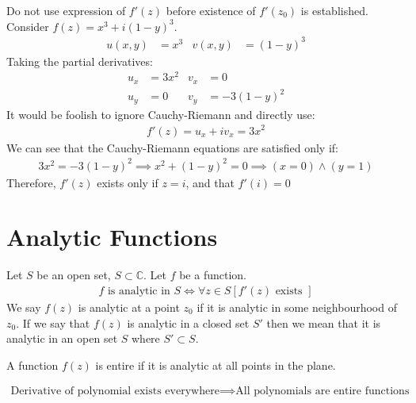 \documentclass[12pt, english]{book}
\begin{document}
	\begin{example}
		Do not use expression of \(f'(z)\) before existence of \(f'(z_0)\)  is established.
		Consider \(f(z) = x^3 + i(1-y)^3\).
		\begin{align*}
			u(x,y) &= x^3	& 	v(x,y) &= (1-y)^3
		\end{align*}
		Taking the partial derivatives:
		\begin{align*}
			u_x &= 3x^2	& 	v_x &= 0\\
			u_y &= 0	&	v_y &= -3(1-y)^2
		\end{align*}
		It would be foolish to ignore Cauchy-Riemann and directly use:
		\begin{align*}
			f'(z) = u_x + iv_x = 3x^2
		\end{align*}
		We can see that the Cauchy-Riemann equations are satisfied only if:
		\begin{align*}
			3x^2 = -3(1-y)^2 \implies  x^2 + (1-y)^2 = 0 \implies (x=0)\land(y=1)
		\end{align*}
		Therefore, \(f'(z)\) exists only if \(z = i\), and that \(f'(i) = 0\)
	\end{example}
	
	\section{Analytic Functions} \label{Analytic Functions - Complex}
	
	\begin{definition}
		\label{Analytic Definition - Complex}
		Let $S$ be an open set, \(S \subset \mathbb{C}\). Let \(f\) be a function.
		\begin{align*}
			f \text{ is analytic in } S \iff \forall z \in S[ f'(z) \text{ exists }]
		\end{align*}
		We say \(f(z)\) is analytic at a point \(z_0\) if it is analytic in some neighbourhood of \(z_0\). If we say that \(f(z)\) is analytic in a closed set \(S'\) then we mean that it is analytic in an open set \(S\) where \(S' \subset S\).
	\end{definition}
	
	\begin{definition}[Entire]
		A function \(f(z)\) is entire if it is analytic at all points in the plane. 
	\end{definition}

	\begin{example}
		\begin{align*}
			\text{Derivative of polynomial exists everywhere} \implies \text{All polynomials are entire functions}
		\end{align*}
	\end{example}
	
\end{document}
